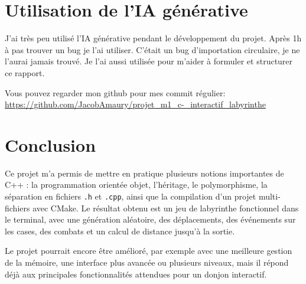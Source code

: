 \documentclass{article}
\begin{document}
\section{Utilisation de l'IA générative}

J'ai très peu utilisé l'IA générative pendant le développement du projet. Après 1h à pas trouver un bug je l'ai utiliser. C'était un bug d'importation circulaire, je ne l'aurai jamais trouvé. Je l'ai aussi utilisée pour m'aider à formuler et structurer ce rapport.

Vous pouvez regarder mon github pour mes commit régulier: \url{https://github.com/JacobAmaury/projet_m1_c-_interactif_labyrinthe}

\section{Conclusion}

Ce projet m'a permis de mettre en pratique plusieurs notions importantes de C++ : la programmation orientée objet, l'héritage, le polymorphisme, la séparation en fichiers \texttt{.h} et \texttt{.cpp}, ainsi que la compilation d'un projet multi-fichiers avec CMake. Le résultat obtenu est un jeu de labyrinthe fonctionnel dans le terminal, avec une génération aléatoire, des déplacements, des événements sur les cases, des combats et un calcul de distance jusqu'à la sortie.

Le projet pourrait encore être amélioré, par exemple avec une meilleure gestion de la mémoire, une interface plus avancée ou plusieurs niveaux, mais il répond déjà aux principales fonctionnalités attendues pour un donjon interactif.
\end{document}
